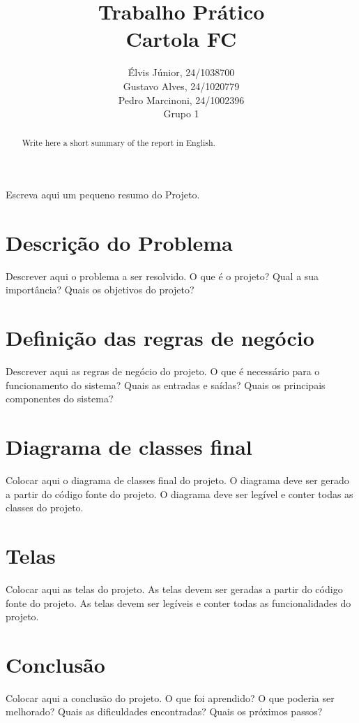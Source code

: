 \documentclass[12pt]{article}
\title{Trabalho Prático\\ 
Cartola FC}
\author{Élvis Júnior, 24/1038700\\
        Gustavo Alves, 24/1020779\\
        Pedro Marcinoni, 24/1002396\\
        Grupo 1
}
\begin{document}
\maketitle

\begin{abstract}
  Write here a short summary of the report in English.
\end{abstract}

\begin{resumo}
  Escreva aqui um pequeno resumo do Projeto.
\end{resumo}


\section{Descrição do Problema}
\label{sec:descricao}

Descrever aqui o problema a ser resolvido. O que é o projeto? Qual a sua importância? Quais os objetivos do projeto?

\section{Definição das regras de negócio}
\label{sec:regras}

Descrever aqui as regras de negócio do projeto. O que é necessário para o funcionamento do sistema? Quais as entradas e saídas? Quais os principais componentes do sistema?

\section{Diagrama de classes final}
\label{sec:classes}

Colocar aqui o diagrama de classes final do projeto. O diagrama deve ser gerado a partir do código fonte do projeto. O diagrama deve ser legível e conter todas as classes do projeto.

\section{Telas}
\label{sec:telas}

Colocar aqui as telas do projeto. As telas devem ser geradas a partir do código fonte do projeto. As telas devem ser legíveis e conter todas as funcionalidades do projeto.

\section{Conclusão}
\label{sec:conclusao}

Colocar aqui a conclusão do projeto. O que foi aprendido? O que poderia ser melhorado? Quais as dificuldades encontradas? Quais os próximos passos?


\end{document}
